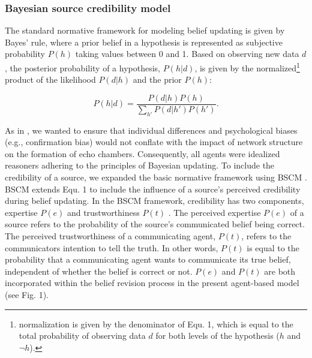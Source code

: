 \documentclass[doc,floatsintext]{apa6}
\begin{document}
\subsubsection{Bayesian source credibility model}
The standard normative framework for modeling belief updating is given by Bayes' rule, where a prior belief in a hypothesis is represented as subjective probability \(P(h)\) taking values between 0 and 1. Based on observing new data \(d\), the posterior probability of a hypothesis, \(P(h|d)\), is given by the normalized\footnote{normalization is given by the denominator of Equ. 1, which is equal to the total probability of observing data \(d\) for both levels of the hypothesis (\(h\) and \(\neg h\)).} product of the likelihood \(P(d|h)\) and the prior \(P(h)\):

\begin{equation}
    P(h|d) = \frac{P(d|h)P(h)}{\sum_{h'}P(d|h')P(h')}.              
\end{equation}

As in \cite{madsen2017growing, madsen2018large}, we wanted to ensure that individual differences and psychological biases (e.g., confirmation bias) would not conflate with the impact of network structure on the formation of echo chambers. Consequently, all agents were idealized reasoners adhering to the principles of Bayesian updating. To include the credibility of a source, we expanded the basic normative framework using BSCM \citep{harris2016appeal}. BSCM extends Equ. 1 to include the influence of a source's perceived credibility during belief updating. In the BSCM framework, credibility has two components, expertise \(P(e)\) and trustworthiness \(P(t)\) \citep{harris2016appeal}. The perceived expertise \(P(e)\) of a source refers to the probability of the source's communicated belief being correct. The perceived trustworthiness of a communicating agent, \(P(t)\), refers to the communicators intention to tell the truth. In other words, \(P(t)\) is equal to the probability that a communicating agent wants to communicate its true belief, independent of whether the belief is correct or not. \(P(e)\) and \(P(t)\) are both incorporated within the belief revision process in the present agent-based model (see Fig. 1).
\end{document}
